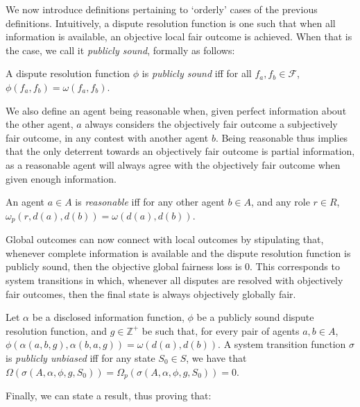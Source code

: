 \documentclass[acmsmall]{custom-arxiv}  %
\begin{document}
We now introduce definitions pertaining to `orderly' cases of the previous definitions. Intuitively, a dispute resolution function is one such that when all information is available, an objective local fair outcome is achieved. When that is the case, we call it \textit{publicly sound}, formally as follows:

\begin{definition}
A dispute resolution function $\phi$ is \textit{publicly sound} iff for all $f_a, f_b \in \mathcal{F}$, $\phi(f_a, f_b) = \omega(f_a, f_b)$.
\end{definition}

We also define an agent being reasonable when, given perfect information about the other agent, $a$ always considers the objectively fair outcome a subjectively fair outcome, in any contest with another agent $b$. Being reasonable thus implies that the only deterrent towards an objectively fair outcome is partial information, as a reasonable agent will always agree with the objectively fair outcome when given enough information.

\begin{definition}
An agent $a \in A$ is \textit{reasonable} iff for any other agent $b \in A$, and any role $r \in R$, $\omega_p(r, d(a), d(b)) = \omega(d(a), d(b))$.
\end{definition}


Global outcomes can now connect with local outcomes by stipulating that, whenever complete information is available and the dispute resolution function is publicly sound, then the objective global fairness loss is 0. This corresponds to system transitions in which, whenever all disputes are resolved with objectively fair outcomes, then the final state is always objectively globally fair. 
\begin{definition}
  \label{definition:publicly-unbiased}
  Let $\alpha$ be a disclosed information function, $\phi$ be a publicly sound dispute resolution function, and $g \in \mathbb{Z}^{+}$ be such that, for every pair of agents $a,b \in A$, $\phi(\alpha(a, b, g), \alpha(b, a, g)) = \omega(d(a), d(b))$.
  A system transition function $\sigma$ is \textit{publicly unbiased} iff for any state $S_0 \in S$, we have that $\Omega(\sigma(A, \alpha, \phi, g, S_0)) = \Omega_p(\sigma(A, \alpha, \phi, g, S_0)) = 0$.
\end{definition}

Finally, we can state a result, thus proving that:
\end{document}
